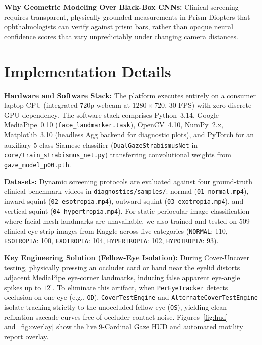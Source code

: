 \documentclass[11pt,a4paper]{article}
\begin{document}
\textbf{Why Geometric Modeling Over Black-Box CNNs:} Clinical screening requires transparent, physically grounded measurements in Prism Diopters that ophthalmologists can verify against prism bars, rather than opaque neural confidence scores that vary unpredictably under changing camera distances.

\section{Implementation Details}
\textbf{Hardware and Software Stack:} The platform executes entirely on a consumer laptop CPU (integrated 720p webcam at $1280\times720$, $30\text{ FPS}$) with zero discrete GPU dependency. The software stack comprises Python~3.14, Google MediaPipe~0.10 (\texttt{face\_landmarker.task}), OpenCV~4.10, NumPy~2.x, Matplotlib~3.10 (headless Agg backend for diagnostic plots), and PyTorch for an auxiliary 5-class Siamese classifier (\texttt{DualGazeStrabismusNet} in \texttt{core/train\_strabismus\_net.py}) transferring convolutional weights from \texttt{gaze\_model\_p00.pth}.

\textbf{Datasets:} Dynamic screening protocols are evaluated against four ground-truth clinical benchmark videos in \texttt{diagnostics/samples/}: normal (\texttt{01\_normal.mp4}), inward squint (\texttt{02\_esotropia.mp4}), outward squint (\texttt{03\_exotropia.mp4}), and vertical squint (\texttt{04\_hypertropia.mp4}). For static periocular image classification where facial mesh landmarks are unavailable, we also trained and tested on 509 clinical eye-strip images from Kaggle across five categories (\texttt{NORMAL}: 110, \texttt{ESOTROPIA}: 100, \texttt{EXOTROPIA}: 104, \texttt{HYPERTROPIA}: 102, \texttt{HYPOTROPIA}: 93).

\textbf{Key Engineering Solution (Fellow-Eye Isolation):} During Cover-Uncover testing, physically pressing an occluder card or hand near the eyelid distorts adjacent MediaPipe eye-corner landmarks, inducing false apparent eye-angle spikes up to $12^\circ$. To eliminate this artifact, when \texttt{PerEyeTracker} detects occlusion on one eye (e.g., \texttt{OD}), \texttt{CoverTestEngine} and \texttt{AlternateCoverTestEngine} isolate tracking strictly to the unoccluded fellow eye (\texttt{OS}), yielding clean refixation saccade curves free of occluder-contact noise. Figures~\ref{fig:hud} and~\ref{fig:overlay} show the live 9-Cardinal Gaze HUD and automated motility report overlay.
\end{document}
